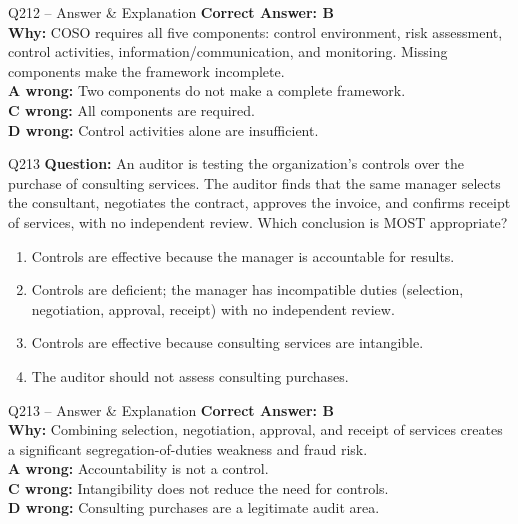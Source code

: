 \documentclass[aspectratio=169,10pt]{beamer}
\begin{document}
	\begin{frame}[t]{Q212 -- Answer \& Explanation}
		\small
		\textbf{Correct Answer: B} \\[4pt]
		\textbf{Why:} COSO requires all five components: control environment, risk assessment, control activities, information/communication, and monitoring. Missing components make the framework incomplete. \\[4pt]
		\textbf{A wrong:} Two components do not make a complete framework. \\[2pt]
		\textbf{C wrong:} All components are required. \\[2pt]
		\textbf{D wrong:} Control activities alone are insufficient.
	\end{frame}
	
	\begin{frame}[t]{Q213}
		\small
		\textbf{Question:} An auditor is testing the organization's controls over the purchase of consulting services. The auditor finds that the same manager selects the consultant, negotiates the contract, approves the invoice, and confirms receipt of services, with no independent review. Which conclusion is MOST appropriate?
		\begin{enumerate}[label=\Alph*.,itemsep=1pt,topsep=2pt]
			\item Controls are effective because the manager is accountable for results.
			\item Controls are deficient; the manager has incompatible duties (selection, negotiation, approval, receipt) with no independent review.
			\item Controls are effective because consulting services are intangible.
			\item The auditor should not assess consulting purchases.
		\end{enumerate}
	\end{frame}
	
	\begin{frame}[t]{Q213 -- Answer \& Explanation}
		\small
		\textbf{Correct Answer: B} \\[4pt]
		\textbf{Why:} Combining selection, negotiation, approval, and receipt of services creates a significant segregation-of-duties weakness and fraud risk. \\[4pt]
		\textbf{A wrong:} Accountability is not a control. \\[2pt]
		\textbf{C wrong:} Intangibility does not reduce the need for controls. \\[2pt]
		\textbf{D wrong:} Consulting purchases are a legitimate audit area.
	\end{frame}
	
\end{document}
